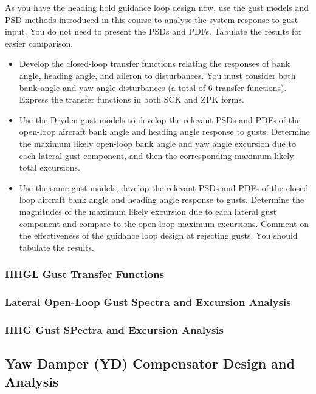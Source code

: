 As you have the heading hold guidance loop design now, use the gust models and PSD methods introduced in this course to analyse the system response to gust input. You do not need to present the PSDs and PDFs. Tabulate the results for easier comparison.
\begin{itemize}
\item Develop the closed-loop transfer functions relating the responses of bank angle, heading angle, and aileron to disturbances. You must consider both bank angle and yaw angle disturbances (a total of 6 transfer functions). Express the transfer functions in both SCK and ZPK forms.
\item Use the Dryden gust models to develop the relevant PSDs and PDFs of the open-loop aircraft bank angle and heading angle response to gusts. Determine the maximum likely open-loop bank angle and yaw angle excursion due to each lateral gust component, and then the corresponding maximum likely total excursions.
\item Use the same gust models, develop the relevant PSDs and PDFs of the closed-loop aircraft bank angle and heading angle response to gusts. Determine the magnitudes of the maximum likely excursion due to each lateral gust component and compare to the open-loop maximum excursions. Comment on the effectiveness of the guidance loop design at rejecting gusts. You should tabulate the results.
\end{itemize}
\subsubsection{HHGL Gust Transfer Functions}

\subsubsection{Lateral Open-Loop Gust Spectra and Excursion Analysis}

\subsubsection{HHG Gust SPectra and Excursion Analysis}

\subsection{Yaw Damper (YD) Compensator Design and Analysis}

